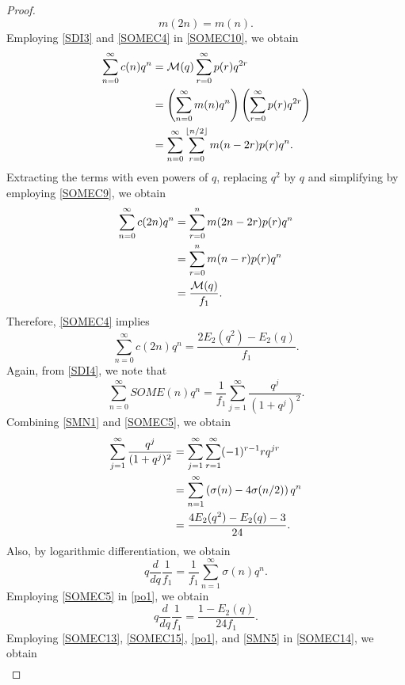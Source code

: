 \documentclass[12pt]{article}
\numberwithin{equation}{section}
\theoremstyle{definition}
\theoremstyle{remark}
\numberwithin{equation}{section}
\begin{document}
\begin{proof}
\begin{equation}
m(2n)=m(n).
\end{equation}
Employing \eqref{SDI3} and  \eqref{SOMEC4} in \eqref{SOMEC10}, we obtain
\begin{align}
\sum_{n=0}^{\infty}c(n)q^n
&=
\mathcal{M}(q)\sum_{r=0}^{\infty}p(r)q^{2r} \notag\\
&=\left(\sum_{n=0}^{\infty}m(n)q^n\right)\left(\sum_{r=0}^{\infty}p(r)q^{2r}\right) \notag\\
&=\sum_{n=0}^{\infty}\sum_{r=0}^{\lfloor n/2\rfloor}m(n-2r)p(r)q^n.\notag
\end{align}
Extracting the terms with even powers of $q$, replacing $q^2$ by $q$ and simplifying by  employing \eqref{SOMEC9}, we obtain
\begin{align}
    \sum_{n=0}^{\infty}c(2n)q^n
    &=\sum_{r=0}^{n}m(2n-2r)p(r)q^n\notag\\
    &=\sum_{r=0}^{n}m(n-r)p(r)q^n \notag \\
&=\dfrac{\mathcal{M}(q)}{f_1}.\notag
\end{align}
Therefore, \eqref{SOMEC4} implies
\begin{equation}\label{SOMEC13}
\sum_{n=0}^{\infty}c(2n)q^n
=
\dfrac{2E_2(q^2)-E_2(q)}{f_1}.
\end{equation}
Again, from  \eqref{SDI4}, we note that
\begin{equation}\label{SOMEC14}
\sum_{n=0}^{\infty}SOME(n)q^n
=
\dfrac{1}{f_1}\sum_{j=1}^{\infty}\dfrac{q^j}{(1+q^j)^2}.
\end{equation}
Combining  \eqref{SMN1} and \eqref{SOMEC5}, we obtain
\begin{align}
\sum_{j=1}^{\infty}\dfrac{q^j}{(1+q^j)^2}
&=\sum_{j=1}^{\infty}\sum_{r=1}^{\infty}
(-1)^{r-1}r q^{jr} \notag\\
&=\sum_{n=1}^{\infty}
\left(\sigma(n)-4\sigma(n/2)\right)q^n \notag\\
&\label{SOMEC15}=\dfrac{4E_2(q^2)-E_2(q)-3}{24}.
\end{align}
Also, by logarithmic differentiation, we obtain
\begin{equation}\label{po1}
q\dfrac{d}{dq}\dfrac{1}{f_1}=\dfrac{1}{f_1}\sum_{n=1}^{\infty}\sigma(n)q^n.\end{equation}
Employing \eqref{SOMEC5} in \eqref{po1}, we obtain
\begin{equation}\label{SMN5}
    q\dfrac{d}{dq}\dfrac{1}{f_1}=\dfrac{1-E_2(q)}{24f_1}.
\end{equation}
Employing \eqref{SOMEC13}, \eqref{SOMEC15}, \eqref{po1}, and \eqref{SMN5} in \eqref{SOMEC14}, we obtain
\begin{align}

\end{align}
\end{proof}
\end{document}
